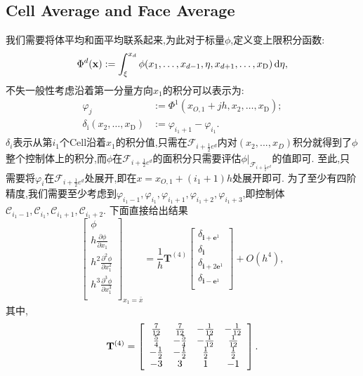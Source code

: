 \documentclass[12pt,halfline,a4paper]{ouparticle}
\begin{document}
\subsection{Cell Average and Face Average}\label{sec:cell_face_average}
我们需要将体平均和面平均联系起来,为此对于标量$\phi$,定义变上限积分函数:
$$
\Phi^{d} ( {\bf x} ) :=\int_{\xi}^{x_{d}} \phi( x_{1}, \ldots, x_{d-1}, \eta, x_{d+1}, \ldots, x_{\mathrm{D}} ) \, \mathrm{d} \eta, 
$$
不失一般性考虑沿着第一分量方向$x_1$的积分可以表示为:
\begin{equation*}
    \begin{aligned}
        \varphi_{j} &:=\Phi^{1} \left( x_{O, 1}+j h, x_{2}, \ldots, x_{\mathrm{D}} \right) ; \\
\delta_{\mathrm{i}} \left( x_{2}, \ldots, x_{\mathrm{D}} \right) &:=\varphi_{i_{1}+1}-\varphi_{i_{1}}. 
    \end{aligned}
\end{equation*}
$\delta_i$表示从第$i_1$个Cell沿着$x_1$的积分值,只需在$\mathcal{F}_{i+\frac12 e^d}$内对$(x_2,...,x_D)$积分就得到了$\phi$整个控制体上的积分,而$\phi$在$\mathcal{F}_{i+\frac12 e^d}$的面积分只需要评估$\phi|_{\mathcal{F}_{i+\frac12 e^d}}$的值即可.
\newline
至此,只需要将$\varphi_{i}$在${\mathcal{F}_{i+\frac12 e^d}}$处展开,即在$x=x_{O, 1}+(i_1+1) h$处展开即可.
为了至少有四阶精度,我们需要至少考虑到$\varphi_{i_1-1},\varphi_{i_1},\varphi_{i_1+1},\varphi_{i_1+2},\varphi_{i_1+3}$,即控制体$\mathcal{C}_{i_1-1},\mathcal{C}_{i_1},\mathcal{C}_{i_1+1},\mathcal{C}_{i_1+2}$.
下面直接给出结果
$$
\left[ \begin{array} {c} {{{\phi}}} \\ {{{h \frac{\partial\phi} {\partial x_{1}}}}} \\ {{{h^{2} \frac{\partial^{2} \phi} {\partial x_{1}^{2}}}}} \\ {{{h^{3} \frac{\partial^{3} \phi} {\partial x_{1}^{3}}}}} \\ \end{array} \right]_{x_{1}=\bar{x}}=\frac{1} {h} \mathbf{T}^{( 4 )} \left[ \begin{array} {c} {{{\delta_{\mathbf{i}+\mathbf{e}^{1}}}}} \\ {{{\delta_{\mathbf{i}}}}} \\ {{{\delta_{\mathbf{i}+2 \mathbf{e}^{1}}}}} \\ {{{\delta_{\mathbf{i}-\mathbf{e}^{1}}}}} \\ \end{array} \right]+O ( h^{4} ), 
$$
其中,
$$
{\bf T}^{( 4 )}=\left[ \begin{array} {c c c c} {{{\frac{7} {1 2}}}} & {{{\frac{7} {1 2}}}} & {{{-\frac{1} {1 2}}}} & {{{-\frac{1} {1 2}}}} \\ {{{\frac{5} {4}}}} & {{{-\frac{5} {4}}}} & {{{-\frac{1} {1 2}}}} & {{{\frac{1} {1 2}}}} \\ {{{-\frac{1} {2}}}} & {{{-\frac{1} {2}}}} & {{{\frac{1} {2}}}} & {{{\frac{1} {2}}}} \\ {{{-3}}} & {{{3}}} & {{{1}}} & {{{-1}}} \\ \end{array} \right]. 
$$
\end{document}
